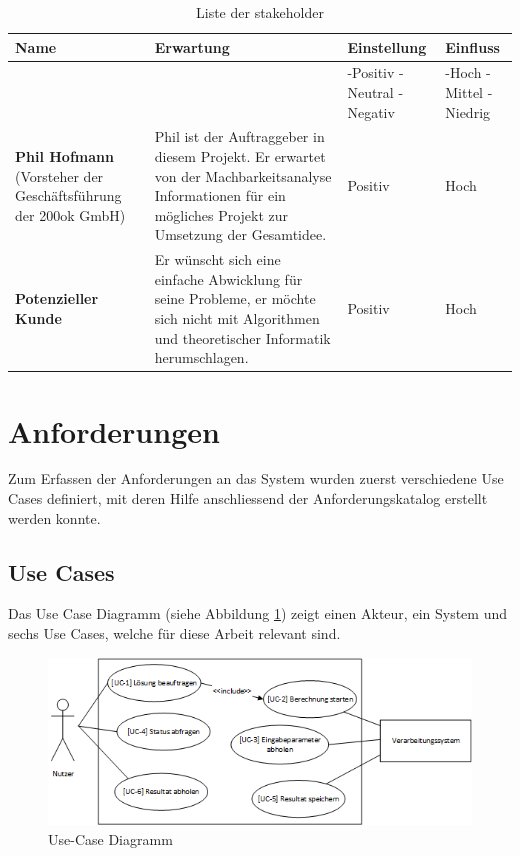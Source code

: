 \begin{table}[ht]
\centering
  \begin{tabular}{ p{5cm} | p{5cm} | p{1.5cm} | p{1.5cm} }
	\hline
	\rowcolor{darkgray}
	\textbf{Name}					&	\textbf{Erwartung}	&	\textbf{Einstellung} 	&	\textbf{Einfluss}	\\ \hline
	\rowcolor{gray}
								&				&	-Positiv \mbox{-Neutral} \mbox{-Negativ} 	&	-Hoch \mbox{-Mittel} \mbox{-Niedrig} \\ \hline
	\textbf{Phil Hofmann} (Vorsteher der Geschäftsführung der 200ok GmbH)						
								&	Phil ist der Auftraggeber in diesem Projekt. Er erwartet von der Machbarkeitsanalyse Informationen für ein mögliches Projekt zur 
									Umsetzung der Gesamtidee.
												& 	Positiv		&	Hoch		\\ \hline
	\textbf{Potenzieller Kunde}
								&	Er wünscht sich eine einfache Abwicklung für seine Probleme, er möchte sich nicht mit Algorithmen und 
									theoretischer Informatik herumschlagen.
												& 	Positiv		&	Hoch		\\ \hline
  \end{tabular}
   \caption{Liste der \gls{stakeholder}}\label{table:stakeholder}
\end{table}

\newpage
\section{Anforderungen}\label{sec.anfoderungen}
Zum Erfassen der Anforderungen an das System wurden zuerst verschiedene Use Cases definiert, mit deren Hilfe anschliessend der Anforderungskatalog erstellt werden konnte.

\subsection{Use Cases}\label{use_cases}
Das Use Case Diagramm (siehe Abbildung \ref{fig:use_case}) zeigt einen Akteur, ein System und sechs Use Cases, welche für diese Arbeit relevant sind.
\begin{figure}[h]
\includegraphics{images/anforderungen/use_cases.png}
\caption[Use-Case Diagramm]{Use-Case Diagramm \selfmade{}}
\label{fig:use_case}
\end{figure}

